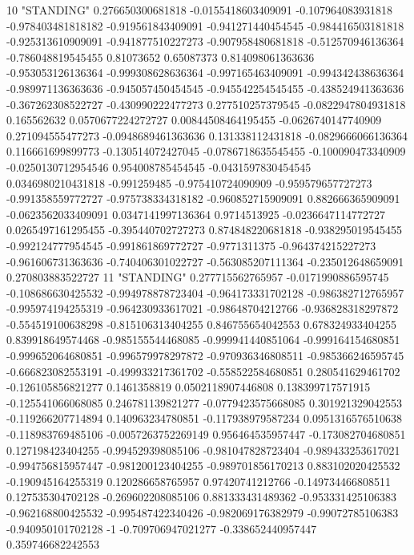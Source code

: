 10 "STANDING" 0.276650300681818 -0.0155418603409091 -0.107964083931818 -0.978403481818182 -0.919561843409091 -0.941271440454545 -0.984416503181818 -0.925313610909091 -0.941877510227273 -0.907958480681818 -0.512570946136364 -0.786048819545455 0.81073652 0.65087373 0.814098061363636 -0.953053126136364 -0.999308628636364 -0.997165463409091 -0.994342438636364 -0.989971136363636 -0.945057450454545 -0.945542254545455 -0.438524941363636 -0.367262308522727 -0.430990222477273 0.277510257379545 -0.0822947804931818 0.165562632 0.0570677224272727 0.00844508464195455 -0.0626740147740909 0.271094555477273 -0.0948689461363636 0.131338112431818 -0.0829666066136364 0.116661699899773 -0.130514072427045 -0.0786718635545455 -0.100090473340909 -0.0250130712954546 0.954008785454545 -0.0431597830454545 0.0346980210431818 -0.991259485 -0.975410724090909 -0.959579657727273 -0.991358559772727 -0.975738334318182 -0.960852715909091 0.882666365909091 -0.0623562033409091 0.0347141997136364 0.9714513925 -0.0236647114772727 0.0265497161295455 -0.395440702727273 0.874848220681818 -0.938295019545455 -0.992124777954545 -0.991861869772727 -0.9771311375 -0.964374215227273 -0.961606731363636 -0.740406301022727 -0.563085207111364 -0.235012648659091 0.270803883522727
11 "STANDING" 0.277715562765957 -0.0171990886595745 -0.108686630425532 -0.994978878723404 -0.964173331702128 -0.986382712765957 -0.995974194255319 -0.964230933617021 -0.98648704212766 -0.936828318297872 -0.554519100638298 -0.815106313404255 0.846755654042553 0.678324933404255 0.839918649574468 -0.985155544468085 -0.999941440851064 -0.999164154680851 -0.999652064680851 -0.996579978297872 -0.970936346808511 -0.985366246595745 -0.666823082553191 -0.499933217361702 -0.558522584680851 0.280541629461702 -0.126105856821277 0.1461358819 0.0502118907446808 0.138399717571915 -0.125541066068085 0.246781139821277 -0.0779423575668085 0.301921329042553 -0.119266207714894 0.140963234780851 -0.117938979587234 0.0951316576510638 -0.118983769485106 -0.0057263752269149 0.956464535957447 -0.173082704680851 0.127198423404255 -0.994529398085106 -0.981047828723404 -0.989433253617021 -0.994756815957447 -0.981200123404255 -0.989701856170213 0.883102020425532 -0.190945164255319 0.120286658765957 0.97420741212766 -0.149734466808511 0.127535304702128 -0.269602208085106 0.881333431489362 -0.953331425106383 -0.962168800425532 -0.995487422340426 -0.982069176382979 -0.99072785106383 -0.940950101702128 -1 -0.709706947021277 -0.338652440957447 0.359746682242553
